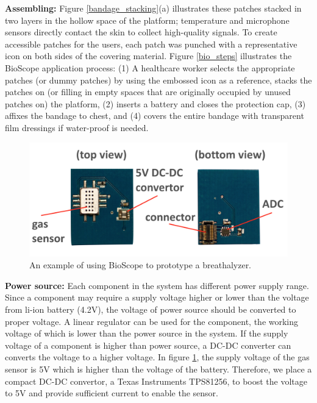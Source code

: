 \vspace{15pt}
\textbf{Assembling:}
\newline
Figure \ref{bandage_stacking}(a) illustrates these patches stacked in two layers in the hollow space of the platform; temperature and microphone sensors directly contact the skin to collect high-quality signals. 
To create accessible patches for the users, each patch was punched with a representative icon on both sides of the covering material. Figure \ref{bio_steps} illustrates the BioScope application process: (1) A healthcare worker selects the appropriate patches (or dummy patches) by using the embossed icon as a reference, stacks the patches on (or filling in empty spaces that are originally occupied by unused patches on) the platform, (2) inserts a battery and closes the protection cap, (3) affixes the bandage to chest, and (4) covers the entire bandage with transparent film dressings if water-proof is needed.
\vspace{15pt}
\begin{figure}[ht]
\centering
\includegraphics[width=15cm]{image/bio_dc_adc}
\caption{An example of using BioScope to prototype a breathalyzer.}
\label{dc_adc}
\end{figure}
\vspace{5pt}

\vspace{10pt}
\textbf{Power source:}
\newline
Each component in the system has different power supply range. Since  a component may require a supply voltage higher or lower than the voltage from li-ion battery (4.2V), the voltage of power source should be converted to proper voltage. A linear regulator can be used for the component, the working voltage of which is lower than the power source in the system. If the supply voltage of a component is higher than power source, a DC-DC converter can converts the voltage to a higher voltage. In figure \ref{dc_adc}, the supply voltage of the gas sensor is 5V which is higher than the voltage of the battery. Therefore, we place a compact DC-DC convertor, a Texas Instruments TPS81256, to boost the voltage to 5V and provide sufficient current to enable the sensor.

